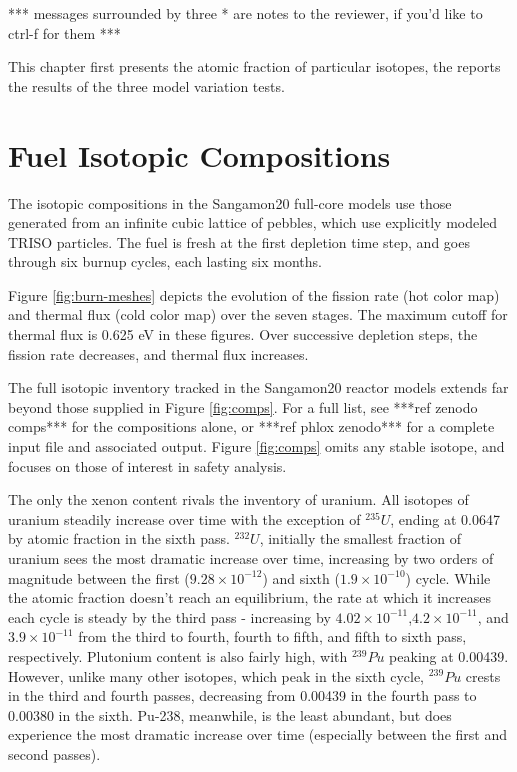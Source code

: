 *** messages surrounded by three * are notes to the reviewer, if you'd like to ctrl-f for them ***

This chapter first presents the atomic fraction of particular isotopes, the reports the results of the three model variation tests.

\section{Fuel Isotopic Compositions}

The isotopic compositions in the Sangamon20 full-core models use those generated from an infinite cubic lattice of pebbles, which use explicitly modeled TRISO particles.  The fuel is fresh at the first depletion time step, and goes through six burnup cycles, each lasting six months.

Figure \ref{fig:burn-meshes} depicts the evolution of the fission rate (hot color map) and thermal flux (cold color map) over the seven stages.  The maximum cutoff for thermal flux is 0.625 eV in these figures.  Over successive depletion steps, the fission rate decreases, and thermal flux increases.


The full isotopic inventory tracked in the Sangamon20 reactor models extends far beyond those supplied in Figure \ref{fig:comps}.  For a full list, see ***ref zenodo comps*** for the compositions alone, or ***ref phlox zenodo*** for a complete input file and associated output.  Figure \ref{fig:comps} omits any stable isotope, and focuses on those of interest in safety analysis.

The only the xenon content rivals the inventory of uranium.  All isotopes of uranium steadily increase over time with the exception of $^{235}U$, ending at 0.0647 by atomic fraction in the sixth pass.  $^{232}U$, initially the smallest fraction of uranium sees the most dramatic increase over time, increasing by two orders of magnitude between the first ($9.28\times10^{-12}$) and sixth ($1.9\times10^{-10}$) cycle.  While the atomic fraction doesn't reach an equilibrium, the rate at which it increases each cycle is steady by the third pass - increasing by $4.02\times10^{-11}$,$4.2\times10^{-11}$, and $3.9\times10^{-11}$ from the third to fourth, fourth to fifth, and fifth to sixth pass, respectively.  Plutonium content is also fairly high, with $^{239}Pu$ peaking at 0.00439.  However, unlike many other isotopes, which peak in the sixth cycle, $^{239}Pu$ crests in the third and fourth passes, decreasing from 0.00439 in the fourth pass to 0.00380 in the sixth.  Pu-238, meanwhile, is the least abundant, but does experience the most dramatic increase over time (especially between the first and second passes).



